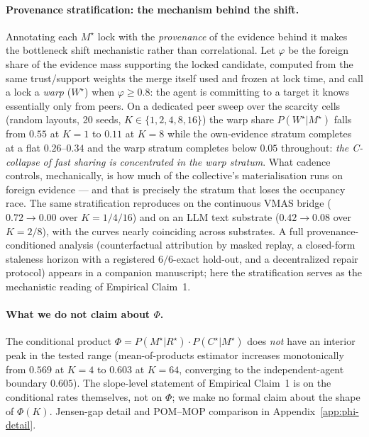 \documentclass{article}
\begin{document}
\paragraph{Provenance stratification: the mechanism behind the shift.}
Annotating each $M^\star$ lock with the \emph{provenance} of the
evidence behind it makes the bottleneck shift mechanistic rather than
correlational. Let $\varphi$ be the foreign share of the evidence mass
supporting the locked candidate, computed from the same trust/support
weights the merge itself used and frozen at lock time, and call a lock
a \emph{warp} ($W^\star$) when $\varphi \ge 0.8$: the agent is
committing to a target it knows essentially only from peers. On a
dedicated peer sweep over the scarcity cells (random layouts, 20
seeds, $K\in\{1,2,4,8,16\}$) the warp share $P(W^\star|M^\star)$
falls from $0.55$ at $K{=}1$ to $0.11$ at $K{=}8$ while the
own-evidence stratum completes at a flat $0.26$--$0.34$ and the warp
stratum completes below $0.05$ throughout: \emph{the C-collapse of
fast sharing is concentrated in the warp stratum}. What cadence
controls, mechanically, is how much of the collective's
materialisation runs on foreign evidence --- and that is precisely
the stratum that loses the occupancy race. The same stratification
reproduces on the continuous VMAS bridge ($0.72\to0.00$ over
$K{=}1/4/16$) and on an LLM text substrate ($0.42\to0.08$ over
$K{=}2/8$), with the curves nearly coinciding across substrates. A
full provenance-conditioned analysis (counterfactual attribution by
masked replay, a closed-form staleness horizon with a registered
$6/6$-exact hold-out, and a decentralized repair protocol) appears in
a companion manuscript; here the stratification serves as the
mechanistic reading of Empirical Claim~1.

\paragraph{What we do not claim about $\Phi$.} The conditional product $\Phi = P(M^\star|R^\star)\!\cdot\!P(C^\star|M^\star)$ does \emph{not} have an interior peak in the tested range (mean-of-products estimator increases monotonically from $0.569$ at $K{=}4$ to $0.603$ at $K{=}64$, converging to the independent-agent boundary $0.605$). The slope-level statement of Empirical Claim~1 is on the conditional rates themselves, not on $\Phi$; we make no formal claim about the shape of $\Phi(K)$. Jensen-gap detail and POM--MOP comparison in Appendix~\ref{app:phi-detail}.
\end{document}
